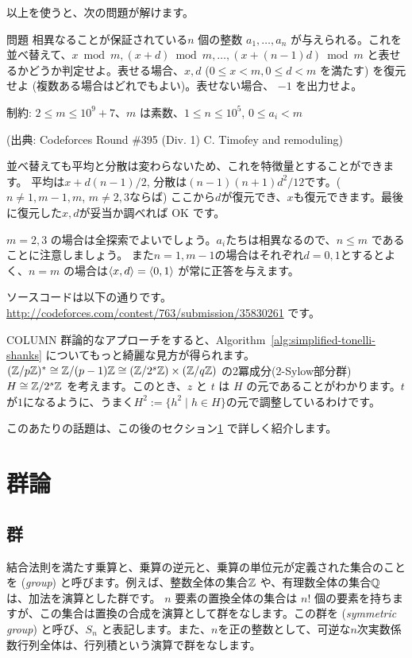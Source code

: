 \documentclass{jsarticle}
\begin{document}
 以上を使うと、次の問題が解けます。

 \begin{itembox}[l]{問題}
  相異なることが保証されている$n$ 個の整数 $a_1, \ldots, a_n$ が与えられる。これを並べ替えて、$x \bmod m, (x + d) \bmod m, \ldots, (x +(n - 1)d) \bmod m$ と表せるかどうか判定せよ。表せる場合、$x, d$ ($0 \le x < m, 0 \le d < m$ を満たす) を復元せよ (複数ある場合はどれでもよい)。表せない場合、 $-1$ を出力せよ。

  制約: $2 \le m \le 10^9 + 7$、$m$ は素数、$1 \le n \le 10^5$, $0 \le a_i < m$

  (出典: Codeforces Round \#395 (Div. 1) C. Timofey and remoduling)
 \end{itembox}
 並べ替えても平均と分散は変わらないため、これを特徴量とすることができます。
 平均は$x + d(n - 1) / 2$, 分散は$(n-1)(n+1)d^2/12$です。($n \neq 1, m-1,m$, $m \neq 2, 3$ならば) ここから$d$が復元でき、$x$も復元できます。最後に復元した$x, d$が妥当か調べれば OK です。

 $m = 2, 3$ の場合は全探索でよいでしょう。$a_i$たちは相異なるので、$n \le m$ であることに注意しましょう。
 また$n = 1, m-1$の場合はそれぞれ$d = 0, 1$とするとよく、$n = m$ の場合は$\langle{x, d}\rangle = \langle{0, 1}\rangle$ が常に正答を与えます。

 ソースコードは以下の通りです。\url{http://codeforces.com/contest/763/submission/35830261} です。
 

\begin{itembox}[l]{COLUMN}
 群論的なアプローチをすると、Algorithm~\ref{alg:simplified-tonelli-shanks} についてもっと綺麗な見方が得られます。
$(\mathbb{Z}/p\mathbb{Z})^* \cong \mathbb{Z}/(p-1)\mathbb{Z} \cong (\mathbb{Z}/2^s\mathbb{Z}) \times (\mathbb{Z}/q\mathbb{Z})$ の2冪成分(2-Sylow部分群) $H \cong \mathbb{Z}/2^s\mathbb{Z}$ を考えます。このとき、$z$ と $t$ は $H$ の元であることがわかります。$t$が$1$になるように、うまく$H^2 := \{h^2 \mid h \in H\}$の元で調整しているわけです。

 このあたりの話題は、この後のセクション\ref{sec:group-theory} で詳しく紹介します。
\end{itembox}
 \section{群論}
 \label{sec:group-theory}
  \subsection{群}
  結合法則を満たす乗算と、乗算の逆元と、乗算の単位元が定義された集合のことを (\emph{group}) と呼びます。例えば、整数全体の集合$\mathbb{Z}$ や、有理数全体の集合$\mathbb{Q}$ は、加法を演算とした群です。
  $n$ 要素の置換全体の集合は $n!$ 個の要素を持ちますが、この集合は置換の合成を演算として群をなします。この群を (\emph{symmetric group}) と呼び、$S_n$ と表記します。また、$n$を正の整数として、可逆な$n$次実数係数行列全体は、行列積という演算で群をなします。
\end{document}
